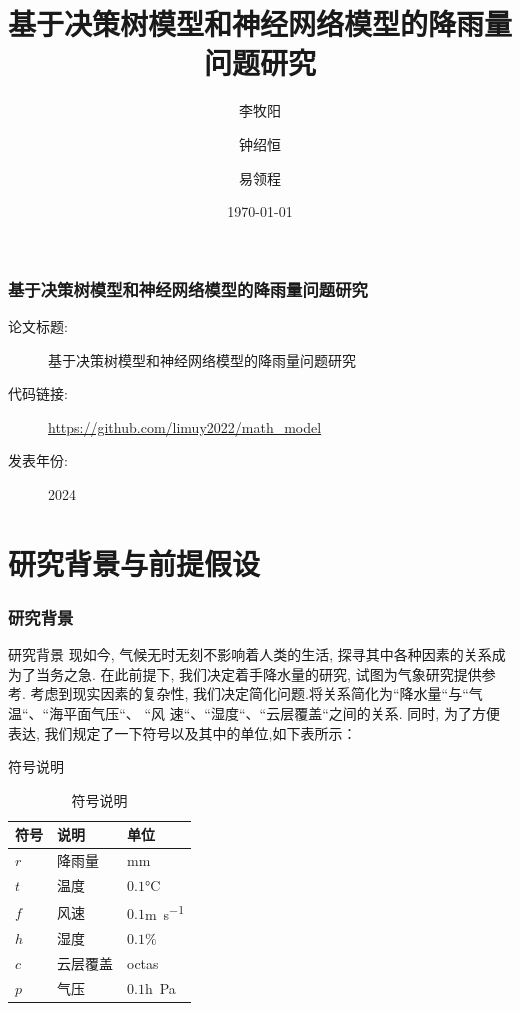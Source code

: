 \documentclass[10pt]{beamer}
\title[]{ {\Large 基于决策树模型和神经网络模型的降雨量问题研究 }}
\author{李牧阳 \and 钟绍恒 \and 易领程}
\institute[VFU] {}
\date{\today} %
\begin{document}
{
\frame{\titlepage}
}





\begin{frame}
	\frametitle{基于决策树模型和神经网络模型的降雨量问题研究}

	\begin{description}
		\item[论文标题:]  基于决策树模型和神经网络模型的降雨量问题研究
		\item[代码链接:]   \url{https://github.com/limuy2022/math_model}
		\item[发表年份:]   2024
	\end{description}

\end{frame}

\section{研究背景与前提假设}
\begin{frame}
	\frametitle{研究背景}
	\begin{block}{研究背景}
		现如今, 气候无时无刻不影响着人类的生活, 探寻其中各种因素的关系成为了当务之急.
		在此前提下, 我们决定着手降水量的研究, 试图为气象研究提供参考.
		考虑到现实因素的复杂性, 我们决定简化问题.将关系简化为``降水量``与``气温``、``海平面气压``、 ``风
		速``、``湿度``、``云层覆盖``之间的关系.
		同时, 为了方便表达, 我们规定了一下符号以及其中的单位,如下表所示：
	\end{block}
	\begin{block}{符号说明}
		\begin{table}[h!]
			\centering
			\caption{符号说明}
			\begin{tabular}{p{6em}p{6em}l}
				\hline
				符号  & 说明   & 单位                          \\
				\hline
				$r$ & 降雨量  & \si{\milli\meter}           \\
				$t$ & 温度   & $0.1$\si{\degreeCelsius}    \\
				$f$ & 风速   & $0.1$\si{\meter\per\second} \\
				$h$ & 湿度   & $0.1\%$                     \\
				$c$ & 云层覆盖 & \si{octas}                  \\
				$p$ & 气压   & $0.1$\si{h\pascal}          \\
				\hline
			\end{tabular}
		\end{table}
	\end{block}
\end{frame}
\end{document}
